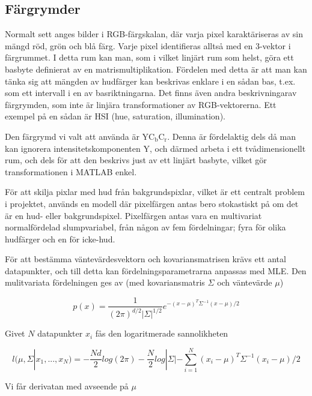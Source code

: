 \documentclass[../rapport_MVEX01-11-05]{subfiles}
\begin{document}
\subsection{Färgrymder}
Normalt sett anges bilder i RGB-färgskalan, där varja pixel
karaktäriseras av sin mängd röd, grön och blå färg. Varje pixel
identifieras alltså med en 3-vektor i färgrummet. I detta rum kan man,
som i vilket linjärt rum som helst, göra ett basbyte definierat av en
matrismultiplikation. Fördelen med detta är att man kan tänka sig att
mängden av hudfärger kan beskrivas enklare i en sådan bas, t.ex. som
ett intervall i en av basriktningarna. Det finns även andra
beskrivningarav färgrymden, som inte är linjära transformationer av
RGB-vektorerna. Ett exempel på en sådan är HSI (hue, saturation,
illumination).%

Den färgrymd vi valt att använda är $\mathrm{YC_bC_r}$. Denna är
fördelaktig dels då man kan ignorera intensitetskomponenten Y, och
därmed arbeta i ett tvådimensionellt rum, och dels för att den
beskrivs just av ett linjärt basbyte, vilket gör transformationen i
MATLAB enkel.

För att skilja pixlar med hud från bakgrundspixlar, vilket är ett
centralt problem i projektet, används en modell där pixelfärgen antas
bero stokastiskt på om det är en hud- eller
bakgrundspixel. Pixelfärgen antas vara en multivariat normalfördelad
slumpvariabel, från någon av fem fördelningar; fyra för olika
hudfärger och en för icke-hud.


För att bestämma väntevärdesvektorn och kovariansmatrisen krävs ett
 antal datapunkter, och till detta kan fördelningsparametrarna
 anpassas med MLE. Den mulitvariata fördelningen ges av (med kovariansmatris
 $\Sigma$ och väntevärde $\mu$)

\begin{equation}
p(x)=\frac{1}{(2\pi)^{d/2}|\Sigma|^{1/2}}e^{-(x-\mu)^T\Sigma^{-1}(x-\mu)/2}
\end{equation}

Givet $N$ datapunkter $x_i$ fås den logaritmerade sannolikheten

\begin{equation}
l(\mu,\Sigma|x_1,...,x_N)=-\frac{Nd}{2}log(2\pi)-\frac{N}{2}log|\Sigma|-\sum_{i=1}^N(x_i-\mu)^T\Sigma^{-1}(x_i-\mu)/2
\end{equation}

Vi får derivatan med avseende på $\mu$
\end{document}
